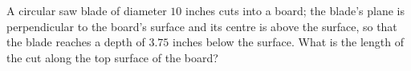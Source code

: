 A circular saw blade of diameter $10$ inches cuts into a board; the blade's plane is perpendicular to the board's surface and its centre is above the surface, so that the blade reaches a depth of $3.75$ inches below the surface. What is the length of the cut along the top surface of the board?
